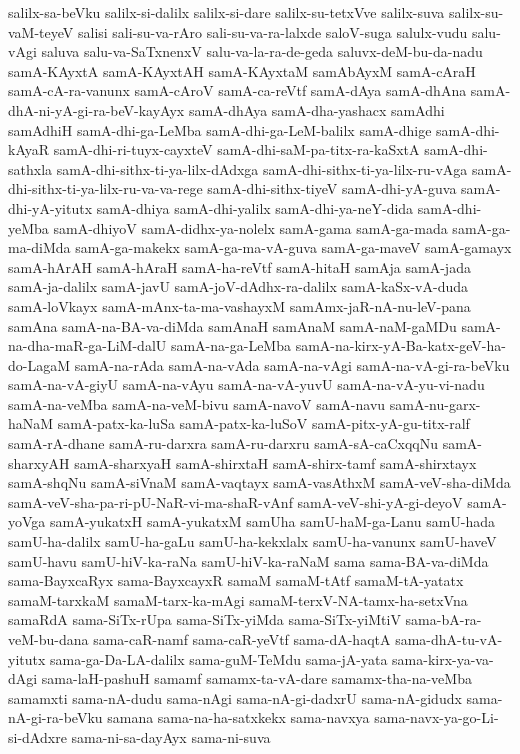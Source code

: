 {salilx-sa-beVku
salilx-si-dalilx
salilx-si-dare
salilx-su-tetxVve
salilx-suva
salilx-su-vaM-teyeV
salisi
sali-su-va-rAro
sali-su-va-ra-lalxde
saloV-suga
salulx-vudu
salu-vAgi
saluva
salu-va-SaTxnenxV
salu-va-la-ra-de-geda
saluvx-deM-bu-da-nadu
samA-KAyxtA
samA-KAyxtAH
samA-KAyxtaM
samAbAyxM
samA-cAraH
samA-cA-ra-vanunx
samA-cAroV
samA-ca-reVtf
samA-dAya
samA-dhAna
samA-dhA-ni-yA-gi-ra-beV-kayAyx
samA-dhAya
samA-dha-yashacx
samAdhi
samAdhiH
samA-dhi-ga-LeMba
samA-dhi-ga-LeM-balilx
samA-dhige
samA-dhi-kAyaR
samA-dhi-ri-tuyx-cayxteV
samA-dhi-saM-pa-titx-ra-kaSxtA
samA-dhi-sathxla
samA-dhi-sithx-ti-ya-lilx-dAdxga
samA-dhi-sithx-ti-ya-lilx-ru-vAga
samA-dhi-sithx-ti-ya-lilx-ru-va-va-rege
samA-dhi-sithx-tiyeV
samA-dhi-yA-guva
samA-dhi-yA-yitutx
samA-dhiya
samA-dhi-yalilx
samA-dhi-ya-neY-dida
samA-dhi-yeMba
samA-dhiyoV
samA-didhx-ya-nolelx
samA-gama
samA-ga-mada
samA-ga-ma-diMda
samA-ga-makekx
samA-ga-ma-vA-guva
samA-ga-maveV
samA-gamayx
samA-hArAH
samA-hAraH
samA-ha-reVtf
samA-hitaH
samAja
samA-jada
samA-ja-dalilx
samA-javU
samA-joV-dAdhx-ra-dalilx
samA-kaSx-vA-duda
samA-loVkayx
samA-mAnx-ta-ma-vashayxM
samAmx-jaR-nA-nu-leV-pana
samAna
samA-na-BA-va-diMda
samAnaH
samAnaM
samA-naM-gaMDu
samA-na-dha-maR-ga-LiM-dalU
samA-na-ga-LeMba
samA-na-kirx-yA-Ba-katx-geV-ha-do-LagaM
samA-na-rAda
samA-na-vAda
samA-na-vAgi
samA-na-vA-gi-ra-beVku
samA-na-vA-giyU
samA-na-vAyu
samA-na-vA-yuvU
samA-na-vA-yu-vi-nadu
samA-na-veMba
samA-na-veM-bivu
samA-navoV
samA-navu
samA-nu-garx-haNaM
samA-patx-ka-luSa
samA-patx-ka-luSoV
samA-pitx-yA-gu-titx-ralf
samA-rA-dhane
samA-ru-darxra
samA-ru-darxru
samA-sA-caCxqqNu
samA-sharxyAH
samA-sharxyaH
samA-shirxtaH
samA-shirx-tamf
samA-shirxtayx
samA-shqNu
samA-siVnaM
samA-vaqtayx
samA-vasAthxM
samA-veV-sha-diMda
samA-veV-sha-pa-ri-pU-NaR-vi-ma-shaR-vAnf
samA-veV-shi-yA-gi-deyoV
samA-yoVga
samA-yukatxH
samA-yukatxM
samUha
samU-haM-ga-Lanu
samU-hada
samU-ha-dalilx
samU-ha-gaLu
samU-ha-kekxlalx
samU-ha-vanunx
samU-haveV
samU-havu
samU-hiV-ka-raNa
samU-hiV-ka-raNaM
sama
sama-BA-va-diMda
sama-BayxcaRyx
sama-BayxcayxR
samaM
samaM-tAtf
samaM-tA-yatatx
samaM-tarxkaM
samaM-tarx-ka-mAgi
samaM-terxV-NA-tamx-ha-setxVna
samaRdA
sama-SiTx-rUpa
sama-SiTx-yiMda
sama-SiTx-yiMtiV
sama-bA-ra-veM-bu-dana
sama-caR-namf
sama-caR-yeVtf
sama-dA-haqtA
sama-dhA-tu-vA-yitutx
sama-ga-Da-LA-dalilx
sama-guM-TeMdu
sama-jA-yata
sama-kirx-ya-va-dAgi
sama-laH-pashuH
samamf
samamx-ta-vA-dare
samamx-tha-na-veMba
samamxti
sama-nA-dudu
sama-nAgi
sama-nA-gi-dadxrU
sama-nA-gidudx
sama-nA-gi-ra-beVku
samana
sama-na-ha-satxkekx
sama-navxya
sama-navx-ya-go-Li-si-dAdxre
sama-ni-sa-dayAyx
sama-ni-suva
}
